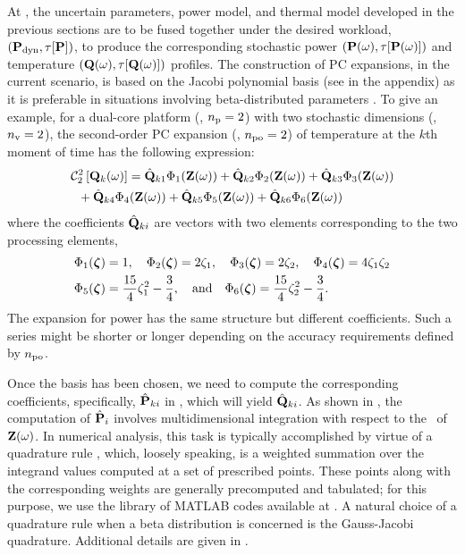 At , the uncertain parameters, power model, and thermal model developed in the previous sections are to be fused together under the desired workload, $\profilePdyn$, to produce the corresponding stochastic power $\profileP{\o}$ and temperature $\profileT{\o}$ profiles.
The construction of PC expansions, in the current scenario, is based on the Jacobi polynomial basis (see  in the appendix) as it is preferable in situations involving beta-distributed parameters \cite{xiu2010}.
To give an example, for a dual-core platform (\ie, ${n_\text{p}} = 2$) with two stochastic dimensions (\ie, ${n_\text{v}} = 2$), the second-order PC expansion (\ie, ${n_\text{po}} = 2$) of temperature at the $k$th moment of time has the following expression:
\begin{align}
  & \oPC{2}{2}{\vTO_k(\o)} = \pcc{\vTO}_{k1} \pcb_1(\vZ(\o)) + \pcc{\vTO}_{k2} \pcb_2(\vZ(\o)) + \pcc{\vTO}_{k3} \pcb_3(\vZ(\o)) \nonumber \\
  & {} \; \; + \pcc{\vTO}_{k4} \pcb_4(\vZ(\o)) + \pcc{\vTO}_{k5} \pcb_5(\vZ(\o)) + \pcc{\vTO}_{k6} \pcb_6(\vZ(\o)) \elabel{pc-example}
\end{align}
where the coefficients $\hat{\mathbf{Q}}_{ki}$ are vectors with two elements corresponding to the two processing elements,
\begin{align*}
  & \Phi_1(\boldsymbol{\zeta}) = 1, \hspace{1em} \Phi_2(\boldsymbol{\zeta}) = 2 \zeta_1, \hspace{1em} \Phi_3(\boldsymbol{\zeta}) = 2 \zeta_2, \hspace{1em} \Phi_4(\boldsymbol{\zeta}) = 4 \zeta_1 \zeta_2 \\
  & \Phi_5(\boldsymbol{\zeta}) = \frac{15}{4} \zeta_1^2 - \frac{3}{4}, \hspace{1em} \text{and} \hspace{1em} \Phi_6(\boldsymbol{\zeta}) = \frac{15}{4} \zeta_2^2 - \frac{3}{4}.
\end{align*}
The expansion for power has the same structure but different coefficients.
Such a series might be shorter or longer depending on the accuracy requirements defined by ${n_\text{po}}$.

Once the basis has been chosen, we need to compute the corresponding coefficients, specifically, $\hat{\mathbf{P}}_{ki}$ in , which will yield $\hat{\mathbf{Q}}_{ki}$.
As shown in , the computation of $\hat{\mathbf{P}}_i$ involves multidimensional integration with respect to the \pdf\ of $\mathbf{Z}(\omega)$.
In numerical analysis, this task is typically accomplished by virtue of a quadrature rule \cite{press2007}, which, loosely speaking, is a weighted summation over the integrand values computed at a set of prescribed points.
These points along with the corresponding weights are generally precomputed and tabulated; for this purpose, we use the library of MATLAB codes available at \cite{burkardt2013}.
A natural choice of a quadrature rule when a beta distribution is concerned is the Gauss-Jacobi quadrature.
Additional details are given in .

